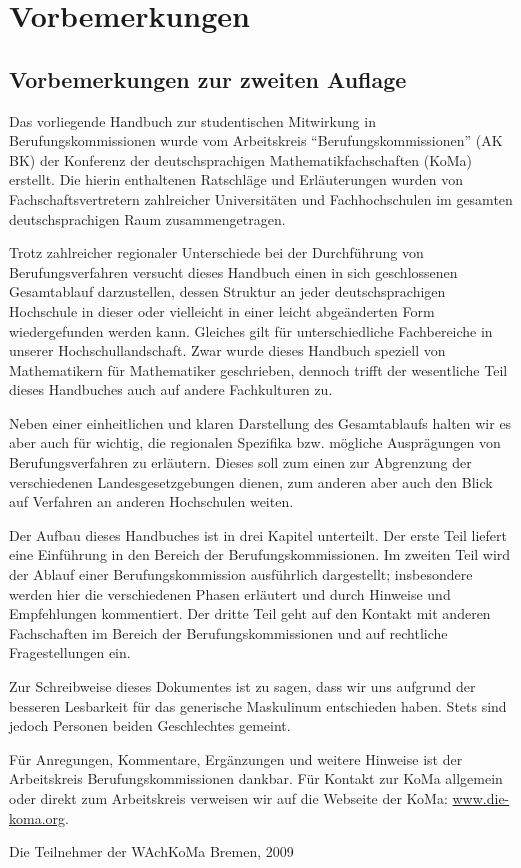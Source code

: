 \chapter*{Vorbemerkungen}\thispagestyle{fancy}

\section*{Vorbemerkungen zur zweiten Auflage}
Das vorliegende Handbuch zur studentischen Mitwirkung in Berufungskommissionen wurde vom Arbeitskreis "`Berufungskommissionen"' (AK BK) der Konferenz der deutschsprachigen Mathematikfachschaften (KoMa) erstellt. Die hierin enthaltenen Ratschläge und Erläuterungen wurden von Fachschaftsvertretern zahlreicher Universitäten und Fachhochschulen im gesamten deutschsprachigen Raum zusammengetragen.

Trotz zahlreicher regionaler Unterschiede bei der Durchführung von Berufungsverfahren versucht dieses Handbuch einen in sich geschlossenen Gesamtablauf darzustellen, dessen Struktur an jeder deutschsprachigen Hochschule in dieser oder vielleicht in einer leicht abgeänderten Form wiedergefunden werden kann. Gleiches gilt für unterschiedliche Fachbereiche in unserer Hochschullandschaft. Zwar wurde dieses Handbuch speziell von Mathematikern für Mathematiker geschrieben, dennoch trifft der wesentliche Teil dieses Handbuches auch auf andere Fachkulturen zu.

Neben einer einheitlichen und klaren Darstellung des Gesamtablaufs halten wir es aber auch für wichtig, die regionalen Spezifika bzw. mögliche Ausprägungen von Berufungsverfahren zu erläutern. Dieses soll zum einen zur Abgrenzung der verschiedenen Landesgesetzgebungen dienen, zum anderen aber auch den Blick auf Verfahren an anderen Hochschulen weiten.

Der Aufbau dieses Handbuches ist in drei Kapitel unterteilt. Der erste Teil liefert eine Einführung in den Bereich der Berufungskommissionen. Im zweiten Teil wird der Ablauf einer Berufungskommission ausführlich dargestellt; insbesondere werden hier die verschiedenen Phasen erläutert und durch Hinweise und Empfehlungen kommentiert. Der dritte Teil geht auf den Kontakt mit anderen Fachschaften im Bereich der Berufungskommissionen und auf rechtliche Fragestellungen ein.

Zur Schreibweise dieses Dokumentes ist zu sagen, dass wir uns aufgrund der besseren Lesbarkeit für das generische Maskulinum entschieden haben. Stets sind jedoch Personen beiden Geschlechtes gemeint.

Für Anregungen, Kommentare, Ergänzungen und weitere Hinweise ist der Arbeitskreis Berufungskommissionen dankbar. Für Kontakt zur KoMa allgemein oder direkt zum Arbeitskreis verweisen wir auf die Webseite der KoMa: \url{www.die-koma.org}.

\vspace{1cm}\noindent
Die Teilnehmer der WAchKoMa Bremen, 2009

